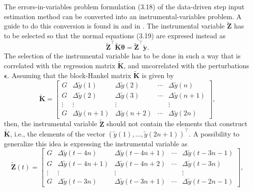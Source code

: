 \documentclass[11pt]{article}
\begin{document}
\begin{itemize}
\begin{itemize}
    The errors-in-variables problem formulation (3.18) of the data-driven step input estimation method can be converted into an instrumental-variables problem.
    A guide to do this conversion is found in \cite{Soderstrom18} and in \cite{Pintelon12Book}. 
    The instrumental variable $\widetilde{\mathbf{Z}}$ has to be selected so that the normal equations (3.19) are expresed instead as
    \begin{equation} \tag{4.22} \widetilde{\mathbf{Z}}^\top \widetilde{\mathbf{K}} \bm{\theta} = \widetilde{\mathbf{Z}}^\top \widetilde{\mathbf{y}} . \label{eqn:neq_siv} \end{equation}
    The selection of the instrumental variable has to be done in such a way that is correlated with the regression matrix $\widetilde{\mathbf{K}}$, and uncorrelated with the perturbations $\bm{\epsilon}$.
    Assuming that the block-Hankel matrix $\widetilde{\mathbf{K}}$ is given by
    \begin{equation} \tag{4.23} \widetilde{\mathbf{K}} = \begin{bmatrix} G & \Delta \widetilde{y}(1) & \Delta \widetilde{y}(2) & \cdots & \Delta \widetilde{y}(n) \\ G & \Delta \widetilde{y}(2) & \Delta \widetilde{y}(3) & \cdots & \Delta \widetilde{y}(n+1) \\ \vdots & \vdots & \vdots & & \vdots \\ G & \Delta \widetilde{y}(n+1) & \Delta \widetilde{y}(n+2) & \cdots & \Delta \widetilde{y}(2n) \end{bmatrix} , \label{eqn:matrixK_r} \end{equation}
    then, the instrumental variable $\widetilde{\mathbf{Z}}$ should not contain the elements that construct $\widetilde{\mathbf{K}}$, i.e., the elements of the vector $\left( \widetilde{y}(1), \ldots, \widetilde{y}(2n+1) \right)^\top$.
    A possibility to generalize this idea is expressing the instrumental variable as
    \begin{equation} \tag{4.24} \widetilde{\mathbf{Z}}(t) = \begin{bmatrix} G & \Delta \widetilde{y}(t-4n) & \Delta \widetilde{y}(t-4n+1) & \cdots & \Delta \widetilde{y}(t-3n-1) \\ G & \Delta \widetilde{y}(t-4n+1) & \Delta \widetilde{y}(t-4n+2) & \cdots & \Delta \widetilde{y}(t-3n) \\ \vdots & \vdots & \vdots & & \vdots \\ G & \Delta \widetilde{y}(t-3n) & \Delta \widetilde{y}(t-3n+1) & \cdots & \Delta \widetilde{y}(t-2n-1) \end{bmatrix} , \label{eqn:matrixZ_t} \end{equation}

\end{itemize}
\end{itemize}
\end{document}
